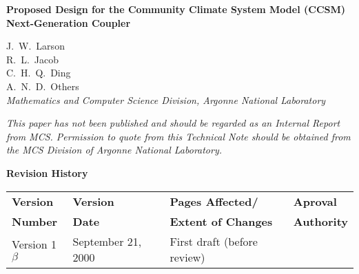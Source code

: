 \documentclass{article}
\begin{document}
\begin{sloppypar}
{\huge\bf
Proposed Design for the Community Climate System Model (CCSM)
Next-Generation Coupler
\\ }                     %
\end{sloppypar}

\vspace{.3in}
             J.~W.~Larson\\
             R.~L.~Jacob\\
             C.~H.~Q.~Ding\\
             A.~N.~D.~Others\\
\vspace{.2in} {\em Mathematics and Computer Science Division,
Argonne National Laboratory\\}

\vfill

{\em This paper has not been published and should  be regarded as
an Internal Report from MCS. Permission to quote from this
Technical Note should be  obtained from the MCS Division of
Argonne National Laboratory.}

\vspace{0.4in}


\thispagestyle{empty}
\newpage




\newpage
\setcounter{page}{2}     %


\vspace*{\fill}

\centerline{\huge\bf Revision History}

\bigskip
{}

\begin{center}
\begin{tabular}{|l|l|l|l|}\hline
{\bf Version} & {\bf Version} & {\bf Pages Affected/}   & {\bf Aproval}\\
{\bf Number}  & {\bf Date}    & {\bf Extent of Changes} & {\bf Authority}\\
\hline\hline Version 1$\beta$ & September 21, 2000      & First
draft (before review) &\\\hline
\end{tabular}
\end{center}
\end{document}
